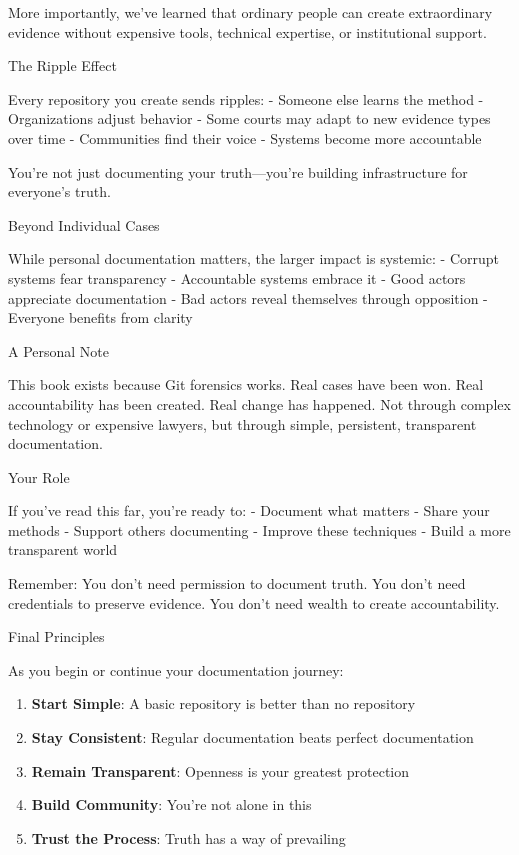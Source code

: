 More importantly, we've learned that ordinary people can create
extraordinary evidence without expensive tools, technical expertise, or
institutional support.

The Ripple Effect

Every repository you create sends ripples: - Someone else learns the
method - Organizations adjust behavior - Some courts may adapt to new
evidence types over time - Communities find their voice - Systems become
more accountable

You're not just documenting your truth---you're building infrastructure
for everyone's truth.

Beyond Individual Cases

While personal documentation matters, the larger impact is systemic: -
Corrupt systems fear transparency - Accountable systems embrace it -
Good actors appreciate documentation - Bad actors reveal themselves
through opposition - Everyone benefits from clarity

A Personal Note

This book exists because Git forensics works. Real cases have been won.
Real accountability has been created. Real change has happened. Not
through complex technology or expensive lawyers, but through simple,
persistent, transparent documentation.

Your Role

If you've read this far, you're ready to: - Document what matters -
Share your methods - Support others documenting - Improve these
techniques - Build a more transparent world

Remember: You don't need permission to document truth. You don't need
credentials to preserve evidence. You don't need wealth to create
accountability.

Final Principles

As you begin or continue your documentation journey:

\begin{enumerate}
\def\labelenumi{\arabic{enumi}.}
\tightlist
\item
  \textbf{Start Simple}: A basic repository is better than no repository
\item
  \textbf{Stay Consistent}: Regular documentation beats perfect
  documentation
\item
  \textbf{Remain Transparent}: Openness is your greatest protection
\item
  \textbf{Build Community}: You're not alone in this
\item
  \textbf{Trust the Process}: Truth has a way of prevailing
\end{enumerate}

